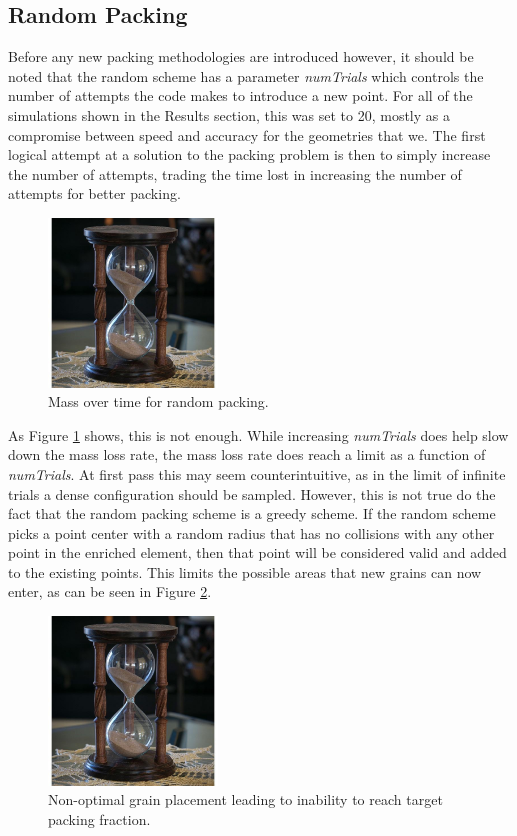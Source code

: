\subsection{Random Packing}
Before any new packing methodologies are introduced however, it should be noted that the random scheme has a parameter \textit{numTrials} which controls the number of attempts the code makes to introduce a new point. For all of the simulations shown in the Results section, this was set to 20, mostly as a compromise between speed and accuracy for the geometries that we. The first logical attempt at a solution to the packing problem is then to simply increase the number of attempts, trading the time lost in increasing the number of attempts for better packing. 

\begin{figure}[htp] 
    \centering
    \includegraphics[width=0.4\textwidth]{figs/hourglass_whole.jpg}
    \caption{Mass over time for random packing.}
    \label{mass_time_random}
\end{figure}

As Figure \ref{mass_time_random} shows, this is not enough. While increasing \textit{numTrials} does help slow down the mass loss rate, the mass loss rate does reach a limit as a function of \textit{numTrials}. At first pass this may seem counterintuitive, as in the limit of infinite trials a dense configuration should be sampled. However, this is not true do the fact that the random packing scheme is a greedy scheme. If the random scheme picks a point center with a random radius that has no collisions with any other point in the enriched element, then that point will be considered valid and added to the existing points. This limits the possible areas that new grains can now enter, as can be seen in Figure \ref{greedy_dem}. 

\begin{figure}[htp] 
    \centering
    \includegraphics[width=0.4\textwidth]{figs/hourglass_whole.jpg}
    \caption{Non-optimal grain placement leading to inability to reach target packing fraction.}
    \label{greedy_dem}
\end{figure}

